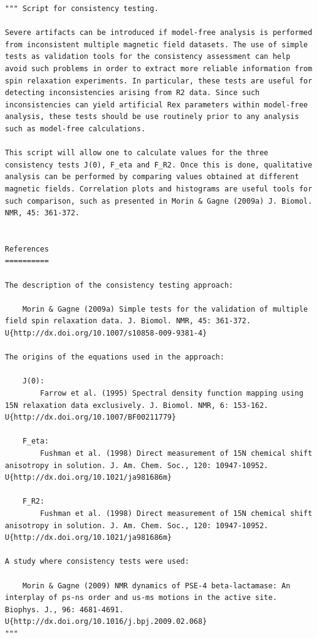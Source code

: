 \begin{lstlisting}
""" Script for consistency testing.

Severe artifacts can be introduced if model-free analysis is performed from inconsistent multiple magnetic field datasets. The use of simple tests as validation tools for the consistency assessment can help avoid such problems in order to extract more reliable information from spin relaxation experiments. In particular, these tests are useful for detecting inconsistencies arising from R2 data. Since such inconsistencies can yield artificial Rex parameters within model-free analysis, these tests should be use routinely prior to any analysis such as model-free calculations.

This script will allow one to calculate values for the three consistency tests J(0), F_eta and F_R2. Once this is done, qualitative analysis can be performed by comparing values obtained at different magnetic fields. Correlation plots and histograms are useful tools for such comparison, such as presented in Morin & Gagne (2009a) J. Biomol. NMR, 45: 361-372.


References
==========

The description of the consistency testing approach:

    Morin & Gagne (2009a) Simple tests for the validation of multiple field spin relaxation data. J. Biomol. NMR, 45: 361-372. U{http://dx.doi.org/10.1007/s10858-009-9381-4}

The origins of the equations used in the approach:

    J(0):
        Farrow et al. (1995) Spectral density function mapping using 15N relaxation data exclusively. J. Biomol. NMR, 6: 153-162. U{http://dx.doi.org/10.1007/BF00211779}

    F_eta:
        Fushman et al. (1998) Direct measurement of 15N chemical shift anisotropy in solution. J. Am. Chem. Soc., 120: 10947-10952. U{http://dx.doi.org/10.1021/ja981686m}

    F_R2:
        Fushman et al. (1998) Direct measurement of 15N chemical shift anisotropy in solution. J. Am. Chem. Soc., 120: 10947-10952. U{http://dx.doi.org/10.1021/ja981686m}

A study where consistency tests were used:

    Morin & Gagne (2009) NMR dynamics of PSE-4 beta-lactamase: An interplay of ps-ns order and us-ms motions in the active site. Biophys. J., 96: 4681-4691. U{http://dx.doi.org/10.1016/j.bpj.2009.02.068}
"""


\end{lstlisting}
